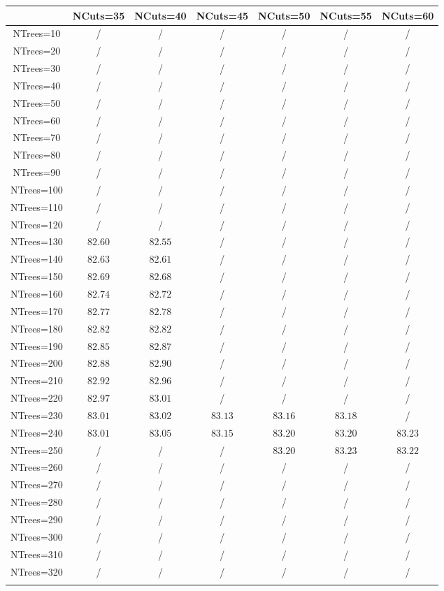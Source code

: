 \centering
\begin{tabular}{ccccccc} \toprule\toprule
 & NCuts=35 & NCuts=40 & NCuts=45 & NCuts=50 & NCuts=55 & NCuts=60\\\midrule
NTrees=10 &  / &  / &  / &  / &  / &  /\\
NTrees=20 &  / &  / &  / &  / &  / &  /\\
NTrees=30 &  / &  / &  / &  / &  / &  /\\
NTrees=40 &  / &  / &  / &  / &  / &  /\\
NTrees=50 &  / &  / &  / &  / &  / &  /\\
NTrees=60 &  / &  / &  / &  / &  / &  /\\
NTrees=70 &  / &  / &  / &  / &  / &  /\\
NTrees=80 &  / &  / &  / &  / &  / &  /\\
NTrees=90 &  / &  / &  / &  / &  / &  /\\
NTrees=100 &  / &  / &  / &  / &  / &  /\\
NTrees=110 &  / &  / &  / &  / &  / &  /\\
NTrees=120 &  / &  / &  / &  / &  / &  /\\
NTrees=130 & $82.60$ & $82.55$ &  / &  / &  / &  /\\
NTrees=140 & $82.63$ & $82.61$ &  / &  / &  / &  /\\
NTrees=150 & $82.69$ & $82.68$ &  / &  / &  / &  /\\
NTrees=160 & $82.74$ & $82.72$ &  / &  / &  / &  /\\
NTrees=170 & $82.77$ & $82.78$ &  / &  / &  / &  /\\
NTrees=180 & $82.82$ & $82.82$ &  / &  / &  / &  /\\
NTrees=190 & $82.85$ & $82.87$ &  / &  / &  / &  /\\
NTrees=200 & $82.88$ & $82.90$ &  / &  / &  / &  /\\
NTrees=210 & $82.92$ & $82.96$ &  / &  / &  / &  /\\
NTrees=220 & $82.97$ & $83.01$ &  / &  / &  / &  /\\
NTrees=230 & $83.01$ & $83.02$ & $83.13$ & $83.16$ & $83.18$ &  /\\
NTrees=240 & $83.01$ & $83.05$ & $83.15$ & $83.20$ & $83.20$ & $83.23$\\
NTrees=250 &  / &  / &  / & $83.20$ & $83.23$ & $83.22$\\
NTrees=260 &  / &  / &  / &  / &  / &  /\\
NTrees=270 &  / &  / &  / &  / &  / &  /\\
NTrees=280 &  / &  / &  / &  / &  / &  /\\
NTrees=290 &  / &  / &  / &  / &  / &  /\\
NTrees=300 &  / &  / &  / &  / &  / &  /\\
NTrees=310 &  / &  / &  / &  / &  / &  /\\
NTrees=320 &  / &  / &  / &  / &  / &  /\\
\bottomrule\bottomrule\\
\end{tabular}
